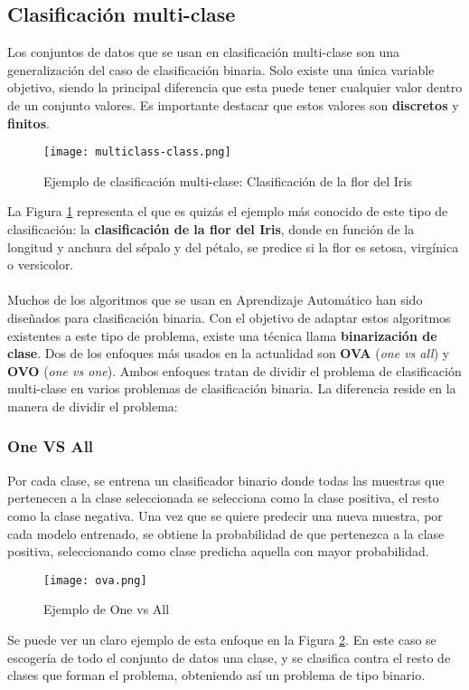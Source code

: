 \subsection*{Clasificación multi-clase}
Los conjuntos de datos que se usan en clasificación multi-clase son una generalización del caso de clasificación binaria. Solo existe una única variable objetivo, siendo la principal diferencia que esta puede tener cualquier valor dentro de un conjunto valores. Es importante destacar que estos valores son \textbf{discretos} y \textbf{finitos}.
\begin{figure}[H]
	\centering
	\texttt{[image: multiclass-class.png]}
	\caption{Ejemplo de clasificación multi-clase: Clasificación de la flor del Iris}
	\label{fig:mcclass}
\end{figure}
La Figura \ref{fig:mcclass} representa el que es quizás el ejemplo más conocido de este tipo de clasificación: la \textbf{clasificación de la flor del Iris}, donde en función de la longitud y anchura del sépalo y del pétalo, se predice si la flor es setosa, virgínica o versicolor.\\\\
\linebreak
Muchos de los algoritmos que se usan en Aprendizaje Automático han sido diseñados para clasificación binaria. Con el objetivo de adaptar estos algoritmos existentes a este tipo de problema, existe una técnica llama \textbf{binarización de clase}.
Dos de los enfoques más usados en la actualidad son \textbf{OVA} (\textit{one vs all}) y \textbf{OVO} (\textit{one vs one}). Ambos enfoques tratan de dividir el problema de clasificación multi-clase en varios problemas de clasificación binaria. La diferencia reside en la manera de dividir el problema:
\subsubsection*{One VS All}
Por cada clase, se entrena un clasificador binario donde todas las muestras que pertenecen a la clase seleccionada se selecciona como la clase positiva, el resto como la clase negativa. Una vez que se quiere predecir una nueva muestra, por cada modelo entrenado, se obtiene la probabilidad de que pertenezca a la clase positiva, seleccionando como clase predicha aquella con mayor probabilidad.
\begin{figure}[H]
	\centering
	\texttt{[image: ova.png]}
	\caption{Ejemplo de One vs All}
	\label{fig:ova}
\end{figure}
Se puede ver un claro ejemplo de esta enfoque en la Figura \ref{fig:ova}. En este caso se escogería de todo el conjunto de datos una clase, y se clasifica contra el resto de clases que forman el problema, obteniendo así un problema de tipo binario.
